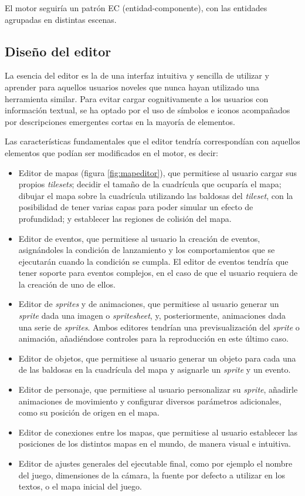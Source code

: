 El motor seguiría un patrón EC (entidad-componente), con las entidades agrupadas en distintas escenas.

\subsection{Diseño del editor}

La esencia del editor es la de una interfaz intuitiva y sencilla de utilizar y aprender para aquellos usuarios noveles que nunca hayan utilizado una herramienta similar. Para evitar cargar cognitivamente a los usuarios con información textual, se ha optado por el uso de símbolos e iconos acompañados por descripciones emergentes cortas en la mayoría de elementos.

\medskip

Las características fundamentales que el editor tendría correspondían con aquellos elementos que podían ser modificados en el motor, es decir:
\begin{itemize}
	\item Editor de mapas (figura \ref{fig:mapeditor}), que permitiese al usuario cargar sus propios \textit{tilesets}; decidir el tamaño de la cuadrícula que ocuparía el mapa; dibujar el mapa sobre la cuadrícula utilizando las baldosas del \textit{tileset}, con la posibilidad de tener varias capas para poder simular un efecto de profundidad; y establecer las regiones de colisión del mapa.
	\item Editor de eventos, que permitiese al usuario la creación de eventos, asignándoles la condición de lanzamiento y los comportamientos que se ejecutarán cuando la condición se cumpla. El editor de eventos tendría que tener soporte para eventos complejos, en el caso de que el usuario requiera de la creación de uno de ellos.
	\item Editor de \textit{sprites} y de animaciones, que permitiese al usuario generar un \textit{sprite} dada una imagen o \textit{spritesheet}, y, posteriormente, animaciones dada una serie de \textit{sprites}. Ambos editores tendrían una previsualización del \textit{sprite} o animación, añadiéndose controles para la reproducción en este último caso. 
	\item Editor de objetos, que permitiese al usuario generar un objeto para cada una de las baldosas en la cuadrícula del mapa y asignarle un \textit{sprite} y un evento.
	\item Editor de personaje, que permitiese al usuario personalizar su \textit{sprite}, añadirle animaciones de movimiento y configurar diversos parámetros adicionales, como su posición de origen en el mapa.
	\item Editor de conexiones entre los mapas, que permitiese al usuario establecer las posiciones de los distintos mapas en el mundo, de manera visual e intuitiva.
	\item Editor de ajustes generales del ejecutable final, como por ejemplo el nombre del juego, dimensiones de la cámara, la fuente por defecto a utilizar en los textos, o el mapa inicial del juego.
\end{itemize} 

